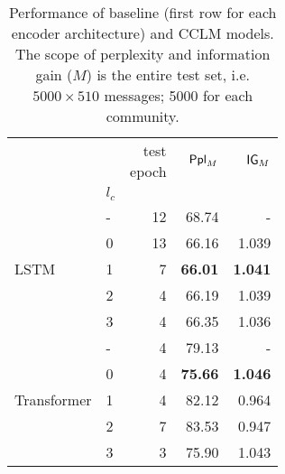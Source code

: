 \documentclass[11pt]{article}
\begin{document}
\begin{table}
  \small
  \centering
  \begin{tabular}{llrrr}
  \toprule
                                 &       & \makecell{test \\ epoch} & $\mathsf{Ppl}_M$ & $\mathsf{IG}_M$     \\
                                 & $l_c$ &         &                 &                   \\
  \midrule
  \multirow{5}{*}{LSTM}         & - &          12 &  68.74          &       -           \\
                                & 0 &          13 &  66.16          &    1.039          \\
                                & 1 &           7 &  \textbf{66.01} &    \textbf{1.041} \\
                                & 2 &           4 &  66.19          &    1.039          \\
                                & 3 &           4 &  66.35          &    1.036          \\
  \midrule
  \multirow{5}{*}{Transformer}  & - &           4 &  79.13          &        -          \\
                                & 0 &           4 &  \textbf{75.66} &    \textbf{1.046} \\
                                & 1 &           4 &  82.12          &    0.964          \\
                                & 2 &           7 &  83.53          &    0.947          \\
                                & 3 &           3 &  75.90          &    1.043          \\
  \bottomrule
  \end{tabular}
  \caption{
    Performance of baseline (first row for each encoder architecture)
    and CCLM models.  The scope of perplexity and information gain
    ($M$) is the entire test set, i.e. $5000×510$ messages; \num{5000}
    for each community.}
  \label{tab:model-results}
\end{table}
\end{document}
